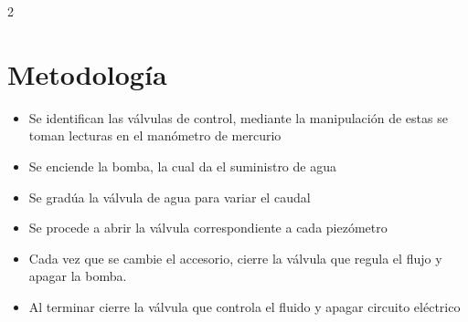 \documentclass{article}
\begin{document}
\begin{multicols}{2}
\section{Metodología}
\begin{itemize}
    \item Se identifican las válvulas de control, mediante la manipulación de estas se toman lecturas en el manómetro de mercurio 
\end{itemize}
\begin{itemize}
    \item Se enciende la bomba, la cual da el suministro de agua 
\end{itemize}
\begin{itemize}
    \item Se gradúa la válvula de agua para variar el caudal 
\end{itemize}
\begin{itemize}
    \item Se procede a abrir la válvula correspondiente a cada piezómetro
\end{itemize}
\begin{itemize}
    \item Cada vez que se cambie el accesorio, cierre la válvula que regula el flujo  y apagar la bomba.
\end{itemize}
\begin{itemize}
    \item Al terminar cierre la válvula que controla el fluido y apagar circuito eléctrico
\end{itemize}

\end{multicols}
\end{document}
